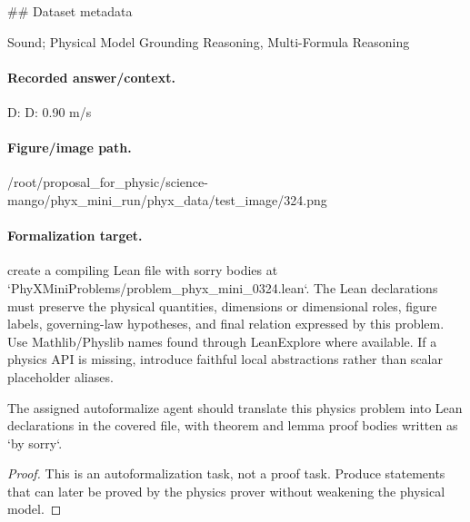 \#\# Dataset metadata

Sound; Physical Model Grounding Reasoning, Multi-Formula Reasoning

\paragraph{Recorded answer/context.}
D: D: 0.90 m/s

\paragraph{Figure/image path.}
/root/proposal\_for\_physic/science-mango/phyx\_mini\_run/phyx\_data/test\_image/324.png

\paragraph{Formalization target.}
create a compiling Lean file with sorry bodies at `PhyXMiniProblems/problem\_phyx\_mini\_0324.lean`. The Lean declarations must preserve the physical quantities, dimensions or dimensional roles, figure labels, governing-law hypotheses, and final relation expressed by this problem.
Use Mathlib/Physlib names found through LeanExplore where available. If a physics API is missing, introduce faithful local abstractions rather than scalar placeholder aliases.

\begin{theorem}
\label{thm:physics:phyx_mini_0324:target}
The assigned autoformalize agent should translate this physics problem into Lean declarations in the covered file, with theorem and lemma proof bodies written as `by sorry`.
\end{theorem}
\begin{proof}
This is an autoformalization task, not a proof task. Produce statements that can later be proved by the physics prover without weakening the physical model.
\end{proof}

